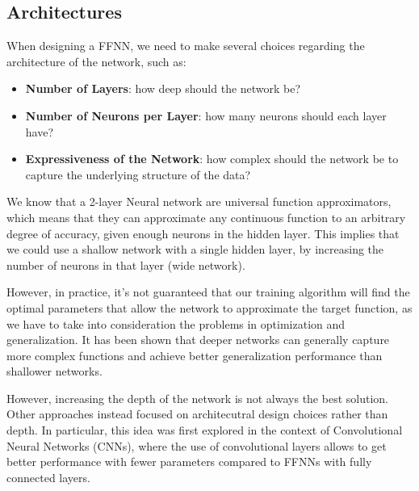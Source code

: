 \subsection{Architectures}
When designing a FFNN, we need to make several choices regarding the architecture of the network, such as:
\begin{itemize}
    \item \textbf{Number of Layers}: how deep should the network be?
    \item \textbf{Number of Neurons per Layer}: how many neurons should each layer have?
    \item \textbf{Expressiveness of the Network}: how complex should the network be to capture the underlying structure of the data?
\end{itemize}
We know that a 2-layer Neural network are universal function approximators, which means that they can approximate any continuous 
function to an arbitrary degree of accuracy, given enough neurons in the hidden layer.
This implies that we could use a shallow network with a single hidden layer, by increasing the number of neurons in that layer (wide network).

However, in practice, it's not guaranteed that our training algorithm will find the optimal parameters that allow the network to approximate the target function, 
as we have to take into consideration the problems in optimization and generalization.
It has been shown that deeper networks can generally capture more complex functions and achieve better generalization performance than shallower networks.

However, increasing the depth of the network is not always the best solution.
Other approaches instead focused on architecutral design choices rather than depth. In particular, this idea was first explored in the context of Convolutional
Neural Networks (CNNs), where the use of convolutional layers allows to get better performance with fewer parameters compared to FFNNs with fully connected layers.